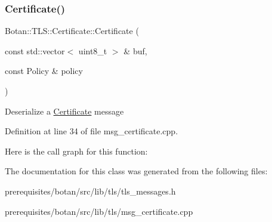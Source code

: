 \subsubsection{\texorpdfstring{Certificate()}{Certificate()}\hspace{0.1cm}{\footnotesize\ttfamily [2/2]}}
{\footnotesize\ttfamily Botan\+::\+T\+L\+S\+::\+Certificate\+::\+Certificate (\begin{DoxyParamCaption}\item[{const std\+::vector$<$ uint8\+\_\+t $>$ \&}]{buf,  }\item[{const Policy \&}]{policy }\end{DoxyParamCaption})\hspace{0.3cm}{\ttfamily [explicit]}}

Deserialize a \mbox{\hyperlink{class_botan_1_1_t_l_s_1_1_certificate}{Certificate}} message 

Definition at line 34 of file msg\+\_\+certificate.\+cpp.

Here is the call graph for this function\+:


The documentation for this class was generated from the following files\+:\begin{DoxyCompactItemize}
\item 
prerequisites/botan/src/lib/tls/tls\+\_\+messages.\+h\item 
prerequisites/botan/src/lib/tls/msg\+\_\+certificate.\+cpp\end{DoxyCompactItemize}
